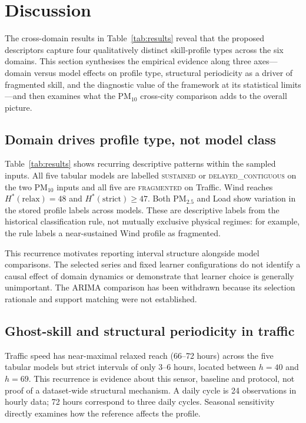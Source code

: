 \documentclass[pdflatex,sn-mathphys]{sn-jnl}
\begin{document}
\section{Discussion}\label{sec:discussion}

The cross-domain results in Table~\ref{tab:results} reveal that the proposed descriptors capture four qualitatively distinct skill-profile types across the six domains. This section synthesises the empirical evidence along three axes—domain versus model effects on profile type, structural periodicity as a driver of fragmented skill, and the diagnostic value of the framework at its statistical limits—and then examines what the PM$_{10}$ cross-city comparison adds to the overall picture.

\subsection{Domain drives profile type, not model class}

Table~\ref{tab:results} shows recurring descriptive patterns within the sampled
inputs. All five tabular models are labelled \textsc{sustained} or
\textsc{delayed\_contiguous} on the two PM$_{10}$ inputs and all five are
\textsc{fragmented} on Traffic. Wind reaches $H^*(\mathrm{relax})=48$ and
$H^*(\mathrm{strict})\geq47$. Both PM$_{2.5}$ and Load show variation in the
stored profile labels across models. These are descriptive labels from the
historical classification rule, not mutually exclusive physical regimes:
for example, the rule labels a near-sustained Wind profile as fragmented.

This recurrence motivates reporting interval structure alongside model
comparisons. The selected series and fixed learner configurations do not
identify a causal effect of domain dynamics or demonstrate that learner
choice is generally unimportant. The ARIMA comparison has been withdrawn
because its selection rationale and support matching were not established.

\subsection{Ghost-skill and structural periodicity in traffic}

Traffic speed has near-maximal relaxed reach (66--72 hours) across the five
tabular models but strict intervals of only 3--6 hours, located between
$h=40$ and $h=69$. This recurrence is evidence about this sensor, baseline and
protocol, not proof of a dataset-wide structural mechanism. A daily cycle is
24 observations in hourly data; 72 hours correspond to three daily cycles.
Seasonal sensitivity directly examines how the reference affects the profile.
\end{document}
